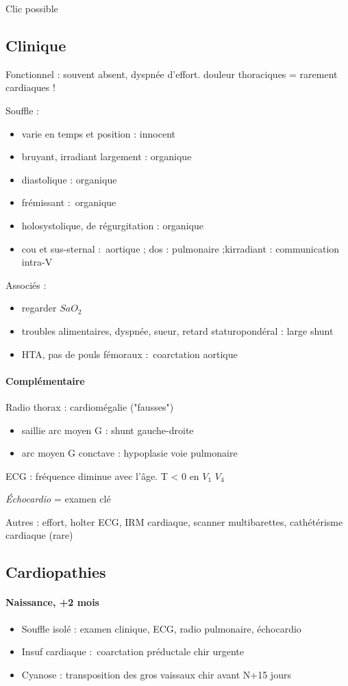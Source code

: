 Clic possible

\subsection{Clinique}
Fonctionnel : souvent absent, dyspnée d'effort. \danger douleur thoraciques =
rarement cardiaques !

Souffle :
\begin{itemize}
  \item varie en temps et position : innocent
  \item bruyant, irradiant largement : organique
  \item diastolique : organique
  \item frémissant : organique
  \item holosystolique, de régurgitation : organique
  \item cou et sus-sternal : aortique ; dos : pulmonaire ;kirradiant :
    communication intra-V
\end{itemize}
Associés : 
\begin{itemize}
  \item regarder $SaO_2$
  \item troubles alimentaires, dyspnée, sueur, retard staturopondéral : large
    shunt
  \item HTA, pas de pouls fémoraux : coarctation aortique
\end{itemize}

\paragraph{Complémentaire}
Radio thorax : cardiomégalie (\danger "fausses")
\begin{itemize}
  \item saillie arc moyen G : shunt gauche-droite
  \item arc moyen G conctave : hypoplasie voie pulmonaire
\end{itemize}

ECG : fréquence diminue avec l'âge. T < 0 en $V_1$ $V_4$

\textit{Échocardio} = examen clé

Autres : effort, holter ECG, IRM cardiaque, scanner multibarettes, cathétérisme
cardiaque (rare)

\subsection{Cardiopathies}
\paragraph{Naissance, +2 mois}
\begin{itemize}
  \item Souffle isolé : examen clinique, ECG, radio pulmonaire, échocardio
  \item Insuf cardiaque : coarctation préductale \thus chir urgente
  \item Cyanose : transposition des gros vaissaux \thus chir avant N+15 jours
\end{itemize}

